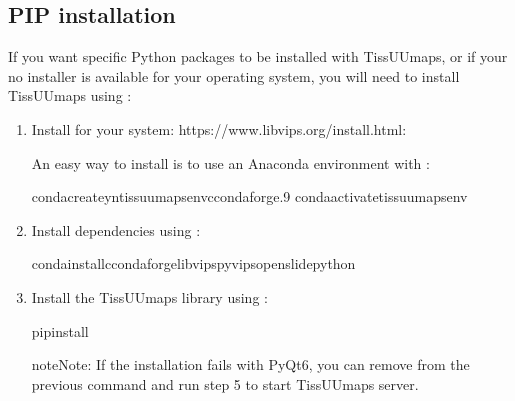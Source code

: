 \documentclass[letterpaper,10pt,english,openany,oneside]{sphinxmanual}
\begin{document}
\subsection{PIP installation}
\label{\detokenize{docs/intro/installation:pip-installation}}
\sphinxAtStartPar
If you want specific Python packages to be installed with TissUUmaps, or if your no installer is available for your operating system, you will need to install TissUUmaps using :
\begin{enumerate}
%
\item {} 
\sphinxAtStartPar
Install  for your system: https://www.libvips.org/install.html:

\sphinxAtStartPar
An easy way to install  is to use an Anaconda environment with :

\begin{sphinxVerbatim}[commandchars=\\\{\}]
condacreate\PYGZhy{}y\PYGZhy{}ntissuumaps\PYGZus{}env\PYGZhy{}cconda\PYGZhy{}forge.9
condaactivatetissuumaps\PYGZus{}env
\end{sphinxVerbatim}

\item {} 
\sphinxAtStartPar
Install dependencies using :

\begin{sphinxVerbatim}[commandchars=\\\{\}]
condainstall\PYGZhy{}cconda\PYGZhy{}forgelibvipspyvipsopenslide\PYGZhy{}python
\end{sphinxVerbatim}

\item {} 
\sphinxAtStartPar
Install the TissUUmaps library using :

\begin{sphinxVerbatim}[commandchars=\\\{\}]
pipinstall
\end{sphinxVerbatim}

\begin{sphinxadmonition}{note}{Note:}
\sphinxAtStartPar
If the installation fails with PyQt6, you can remove \sphinxcode{\sphinxupquote{{[}full{]}}} from the previous command and run step 5 to start TissUUmaps server.
\end{sphinxadmonition}


\end{enumerate}
\end{document}
